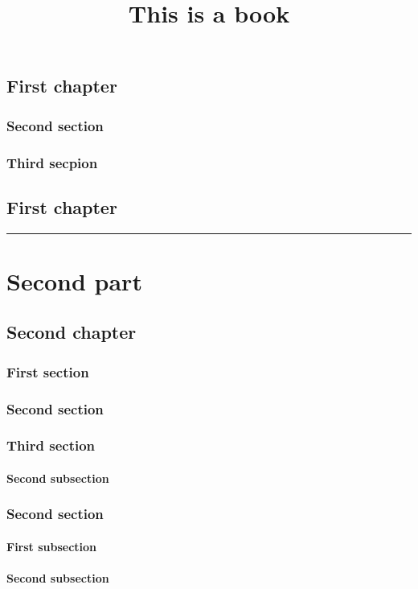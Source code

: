 \documentclass[twoside, 10pt]{book}
\title{This is a book}
\begin{document}
\mainmatter
{}
\lipsum
\lipsum
\chapter{First chapter}
\chaptertoc{}
\lipsum[1]
\section{Second section}
\lipsum[1]
\section{Third secpion}
\lipsum[1]
\chapter{First chapter}
\rule{\textwidth}{1.5pt}
\lipsum
\part{Second part}
\lipsum
\chapter{Second chapter}
\chaptertoc{}
\section{First section}
\lipsum[1]
\section{Second section}
\lipsum[1]
\section{Third section}
\lipsum[1]
\subsection{Second subsection}
\lipsum
\section{Second section}
\subsection{First subsection}
\lipsum
\subsection{Second subsection}
\lipsum
\end{document}
